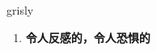 
\begin{frame}
{\huge grisly}
\begin{center}
\begin{enumerate}\Large
  \item \textbf{令人反感的，令人恐惧的}
\end{enumerate}
\end{center}
\end{frame}
